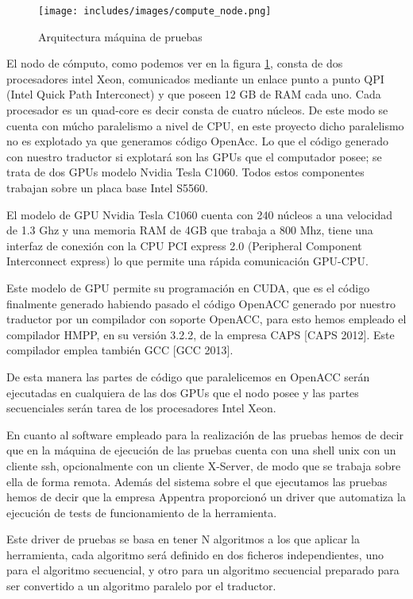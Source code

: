 \begin{figure}[t]
\centering
\texttt{[image: includes/images/compute\_node.png]}
\caption{Arquitectura máquina de pruebas}
\label{fig:TestsMachine}
\end{figure}

El nodo de cómputo, como podemos ver en la figura \ref{fig:TestsMachine}, consta de dos procesadores intel Xeon, comunicados mediante un enlace punto a punto QPI (Intel Quick Path Interconect) y que poseen 12 GB de RAM cada uno. Cada procesador es un quad-core es decir consta de cuatro núcleos. De este modo se cuenta con múcho paralelismo a nivel de CPU, en este proyecto dicho paralelismo no es explotado ya que generamos código OpenAcc. Lo que el código generado con nuestro traductor si explotará son las GPUs que el computador posee; se trata de dos GPUs modelo Nvidia Tesla C1060. Todos estos componentes trabajan sobre un placa base Intel S5560.

El modelo de GPU Nvidia Tesla C1060 cuenta con 240 núcleos a una velocidad de 1.3 Ghz y una memoria RAM de 4GB que trabaja a 800 Mhz, tiene una interfaz de conexión con la CPU PCI express 2.0 (Peripheral Component Interconnect express) lo que permite una rápida comunicación GPU-CPU.

Este modelo de GPU permite su programación en CUDA, que es el código finalmente generado habiendo pasado el código OpenACC generado por nuestro traductor por un compilador con soporte OpenACC, para esto hemos empleado el compilador HMPP, en su versión 3.2.2, de la empresa CAPS [CAPS 2012]. Este compilador emplea también GCC [GCC 2013].

De esta manera las partes de código que paralelicemos en OpenACC serán ejecutadas en cualquiera de las dos GPUs que el nodo posee y las partes secuenciales serán tarea de los procesadores Intel Xeon.

En cuanto al software empleado para la realización de las pruebas hemos de decir que en la máquina de ejecución de las pruebas cuenta con una shell unix con un cliente ssh, opcionalmente con un cliente X-Server, de modo que se trabaja sobre ella de forma remota. Además del sistema sobre el que ejecutamos las pruebas hemos de decir que la empresa Appentra proporcionó un driver que automatiza la ejecución de tests de funcionamiento de la herramienta.

Este driver de pruebas se basa en tener N algoritmos a los que aplicar la herramienta, cada algoritmo será definido en dos ficheros independientes, uno para el algoritmo secuencial, y otro para un algoritmo secuencial preparado para ser convertido a un algoritmo paralelo por el traductor.


